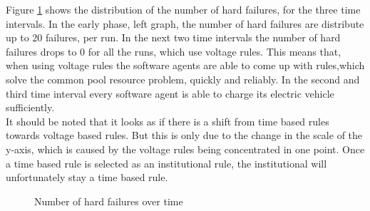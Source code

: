 \documentclass[a4paper]{article}
\begin{document}
Figure \ref{hard_over_time} shows the distribution of the number of hard failures, for the three time intervals. In the early phase,
left graph, the number of hard failures are distribute up to 20 failures, per run. In the next two time intervals the number of 
hard failures drops to 0 for all the runs, which use voltage rules. This means that, when using voltage rules the software agents 
are able to come up with rules,which solve the common pool resource problem, quickly and reliably. In the second and third time interval
every software agent is able to charge its electric vehicle sufficiently. \\
It should be noted that it looks as if there is a shift from time based rules towards voltage based rules. But this is only due to the 
change in the scale of the y-axis, which is caused by the voltage rules being concentrated in one point. Once a time based rule 
is selected as an institutional rule, the institutional will unfortunately stay a time based rule. 
\begin{figure}[!ht]
\caption{Number of hard failures over time}
\label{hard_over_time}
\end{figure}
\end{document}
